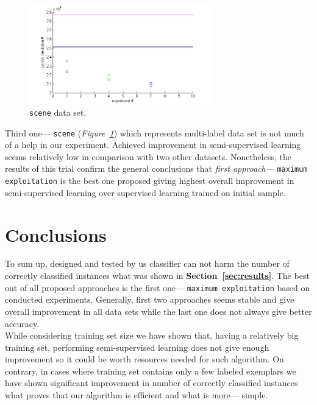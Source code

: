 \documentclass[12pt, a4paper, pdflatex]{report}
\begin{document}
\begin{figure}[htbp]
	\centering
	\includegraphics[width=0.7\textwidth]{graphics/figures/fig3.jpg}
	\begin{tiny}
		\caption{\small \texttt{scene} data set.\label{img:scene}}
	\end{tiny}
\end{figure}

Third one--- \texttt{scene} (\emph{Figure~\ref{img:scene}}) which represents multi-label data set is not much of a help in our experiment. Achieved improvement in semi-supervised learning seems relatively low in comparison with two other datasets. Nonetheless, the results of this trial confirm the general conclusions that \emph{first approach}--- \texttt{maximum exploitation} is the best one proposed giving highest overall improvement in semi-supervised learning over supervised learning trained on initial sample.\\


\section{Conclusions}
To sum up, designed and tested by us classifier can not harm the number of correctly classified instances what was shown in \textbf{Section~\ref{sec:results}}. The best out of all proposed approaches is the first one--- \texttt{maximum exploitation} based on conducted experiments. Generally, first two approaches seems stable and give overall improvement in all data sets while the last one does not always give better accuracy.\\

While considering training set size we have shown that, having a relatively big training set, performing semi-supervised learning does not give enough improvement so it could be worth resources needed for such algorithm. On contrary, in cases where training set contains only a few labeled exemplars we have shown significant improvement in number of correctly classified instances what proves that our algorithm is efficient and what is more--- simple.\\
\end{document}
